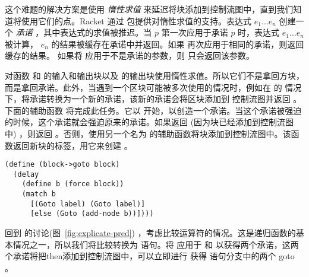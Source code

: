 \documentclass[11pt]{book}
\begin{document}
这个难题的解决方案是使用 \emph{惰性求值}\citep{Friedman:1976aa} 来延迟将块添加到控制流图中，直到我们知道将使用它们的点。Racket 通过
\href{https://docs.racket-lang.org/reference/Delayed_Evaluation.html}{}
包提供对惰性求值的支持。表达式  $e_1 \ldots e_n$\key{)}
 创建一个 \emph{承诺} ，其中表达式的求值被推迟。当 
$p$\key{)} 第一次应用于承诺 $p$ 时，表达式 $e_1 \ldots e_n$ 被计算，
$e_n$ 的结果被缓存在承诺中并返回。如果  再次应用于相同的承诺，则返回缓存的结果。
如果将  应用于不是承诺的参数，则
 只会返回该参数。

对函数  和  的输入和输出块以及  的输出块使用惰性求值。所以它们不是拿回方块，而是拿回承诺。此外，当遇到一个区块可能被多次使用的情况时，例如在  的  情况下，将承诺转换为一个新的承诺，该新的承诺会将区块添加到 控制流图并返回  。下面的辅助函数  将完成此任务。它以  开始，以创造一个承诺。当这个承诺被强迫的时候，这个承诺就会强迫原来的承诺。如果返回  (因为块已经添加到控制流图中) ，则返回
 。否则，使用另一个名为  的辅助函数将块添加到控制流图中。该函数返回新块的标签，用它来创建
 。
\begin{lstlisting}
(define (block->goto block)
  (delay
    (define b (force block))
    (match b
      [(Goto label) (Goto label)]
      [else (Goto (add-node b))])))
\end{lstlisting}

回到 
的讨论(图~\ref{fig:explicate-pred}) ，考虑比较运算符的情况。这是递归函数的基本情况之一，所以我们将比较转换为  语句。将
 应用于  和  以获得两个承诺，这两个承诺将把then添加到控制流图中，可以立即进行
 获得
 语句分支中的两个 goto 。

\end{document}
